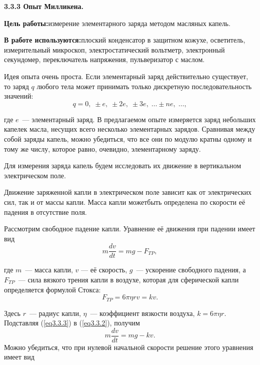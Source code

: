 {\large \bf 3.3.3 Опыт Милликена.}

{\bf Цель работы:}{измерение элементарного заряда методом масляных капель.}

{\bf В работе используются:}{плоский конденсатор в защитном кожухе, осветитель, измерительный микроскоп, электростатический вольтметр,
электронный секундомер, переключатель напряжения, пульверизатор с маслом.}


Идея опыта очень проста. Если элементарный заряд действительно существует, то заряд $q$ любого тела может принимать
только дискретную последовательность значений:
\begin{equation}
q=0,\;\pm e,\;\pm 2e,\;\pm 3e,\;\ldots\pm ne,\;\ldots,
\label{eq3.3.1}
\end{equation}

где $e$~--- элементарный заряд. В предлагаемом опыте измеряется заряд небольших капелек масла, несущих всего несколько элементарных зарядов. Сравнивая между собой заряды капель, можно убедиться, что все они по модулю кратны одному и тому же числу, которое равно, очевидно, элементарному заряду.

Для измерения заряда капель будем исследовать их движение в вертикальном электрическом поле.

Движение заряженной капли в электрическом поле зависит как от электрических сил, так и от массы капли. Масса капли можетбыть определена по скорости её падения в отсутствие поля.

Рассмотрим свободное падение капли. Уравнение её движения при падении имеет вид
\begin{equation}
m\frac{dv}{dt}=mg-F_{TP},
\label{eq3.3.2}
\end{equation}

где $m$~--- масса капли, $v$ --- её скорость, $g$~--- ускорение свободного падения, а $F_{TP}$~--- сила вязкого трения капли в воздухе, которая для сферической капли определяется формулой Стокса:
\begin{equation}
F_{TP}=6\pi\eta rv=kv.
\label{eq3.3.3}
\end{equation}

Здесь $r$~--- радиус капли, $\eta$~--- коэффициент вязкости воздуха, $k=6\pi\eta r$. Подставляя (\ref{eq3.3.3}) в (\ref{eq3.3.2}), получим
\begin{equation}
m\frac{dv}{dt}=mg -kv.
\label{eq3.3.4}
\end{equation}
Можно убедиться, что при нулевой начальной скорости решение этого уравнения имеет вид

